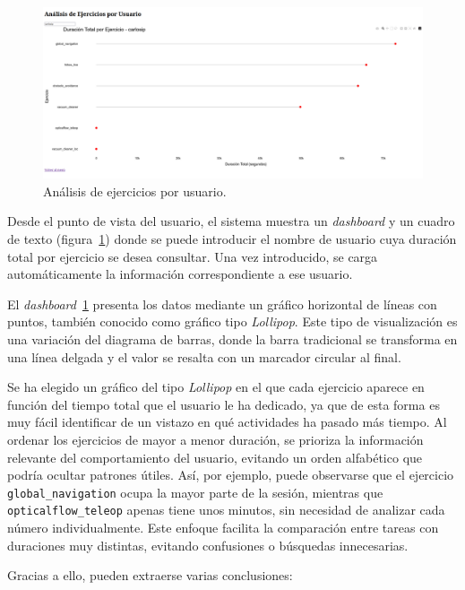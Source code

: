 \documentclass[a4paper, 12pt]{book}
\begin{document}
\begin{figure}[H]
  \centering
  \includegraphics[width=1.1\textwidth]{img/1a.png}
  \caption{Análisis de ejercicios por usuario.}
  \label{fig:1a}
\end{figure}

Desde el punto de vista del usuario, el sistema muestra un \textit{dashboard} y un cuadro de texto (figura~\ref{fig:1a}) donde se puede introducir el nombre de usuario cuya duración total por ejercicio se desea consultar. Una vez introducido, se carga automáticamente la información correspondiente a ese usuario.

El \textit{dashboard}~\ref{fig:1a} presenta los datos mediante un gráfico horizontal de líneas con puntos, también conocido como gráfico tipo \textit{Lollipop}. Este tipo de visualización es una variación del diagrama de barras, donde la barra tradicional se transforma en una línea delgada y el valor se resalta con un marcador circular al final.

Se ha elegido un gráfico del tipo \textit{Lollipop} en el que cada ejercicio aparece en función del tiempo total que el usuario le ha dedicado, ya que de esta forma es muy fácil identificar de un vistazo en qué actividades ha pasado más tiempo. Al ordenar los ejercicios de mayor a menor duración, se prioriza la información relevante del comportamiento del usuario, evitando un orden alfabético que podría ocultar patrones útiles. Así, por ejemplo, puede observarse que el ejercicio \texttt{global\_navigation} ocupa la mayor parte de la sesión, mientras que \texttt{opticalflow\_teleop} apenas tiene unos minutos, sin necesidad de analizar cada número individualmente. Este enfoque facilita la comparación entre tareas con duraciones muy distintas, evitando confusiones o búsquedas innecesarias.

Gracias a ello, pueden extraerse varias conclusiones:
\end{document}
